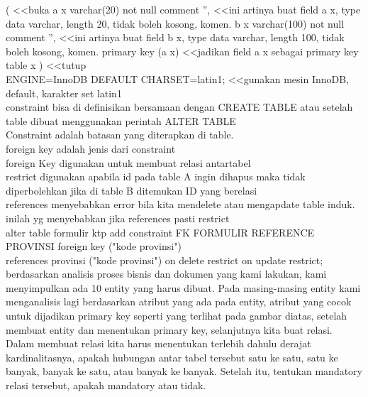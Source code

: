 (                                                        <<buka
   a x              varchar(20) not null  comment '',    <<ini artinya  buat field a x, type data varchar, length 20, tidak boleh kosong, komen.
   b x              varchar(100) not null  comment '',   <<ini artinya  buat field b x, type data varchar, length 100, tidak boleh kosong, komen.
   primary key (a x)                                     <<jadikan field a x sebagai primary key table x
)                                                        <<tutup\\
ENGINE=InnoDB DEFAULT CHARSET=latin1;                    <<gunakan mesin InnoDB, default, karakter set latin1\\


constraint bisa di definisikan bersamaan dengan CREATE TABLE atau setelah table dibuat menggunakan perintah ALTER TABLE\\
Constraint adalah batasan yang diterapkan di table.\\
foreign key adalah jenis dari constraint\\
foreign Key digunakan untuk membuat relasi antartabel\\
restrict digunakan apabila id pada table A ingin dihapus maka tidak diperbolehkan jika di table B ditemukan ID yang berelasi\\
references menyebabkan error bila kita mendelete atau mengapdate table induk. inilah yg menyebabkan jika references pasti restrict\\

alter table formulir ktp add constraint FK FORMULIR REFERENCE PROVINSI foreign key ("kode provinsi")\\
      references provinsi ("kode provinsi") on delete restrict on update restrict;\\
berdasarkan analisis proses bisnis dan dokumen yang kami lakukan, kami menyimpulkan ada 10 entity yang harus dibuat. Pada masing-masing entity kami menganalisis lagi berdasarkan atribut yang ada pada entity, atribut yang cocok untuk dijadikan primary key seperti yang terlihat pada gambar diatas, setelah membuat entity dan menentukan primary key, selanjutnya kita buat relasi. Dalam membuat relasi kita harus menentukan terlebih dahulu derajat kardinalitasnya, apakah hubungan antar tabel tersebut satu ke satu, satu ke banyak, banyak ke satu, atau banyak ke banyak. Setelah itu, tentukan mandatory relasi tersebut, apakah mandatory atau tidak. \\


